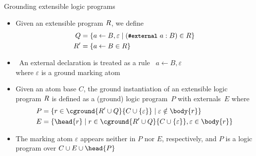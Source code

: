 \begin{frame}[fragile]{Grounding extensible logic programs}
  \begin{itemize}
  \item <1->
    Given an extensible program $R$,
    we define
    \begin{align*}
      Q & {} = \{a\leftarrow B,\varepsilon\mid({\small\textbf{\texttt{\#external}}}~a : B)\in R\}\\
      R'& {} = \{a\leftarrow B\in R\}
    \end{align*}
  \item <2->  \
    An external declaration is treated as a rule \
    \(
    a \leftarrow B,\varepsilon
    \)\\
    where $\varepsilon$ is a ground marking atom
  \item <3->
    Given an atom base $C$,
    the ground instantiation of an extensible logic program $R$ is defined as
    a (ground) \alert{logic program}~$P$ \alert{with externals}~$E$
    where
    \begin{align*}
      P & {} = \{r\in\cground{\RRG'\cup \QRG}{C\cup\{\varepsilon\}} \mid \varepsilon\notin\body{r}\}\\
      E & {} = \{\head{r}\mid r\in\cground{\RRG'\cup \QRG}{C\cup\{\varepsilon\}}, \varepsilon\in\body{r}\}
    \end{align*}
  \item <4-> \structure{Note} The marking atom $\varepsilon$ appears neither in $P$ nor $E$, respectively,
    \phantom{Note} and $P$ is a logic program over $C\cup E\cup\head{P}$
  \end{itemize}
\end{frame}
